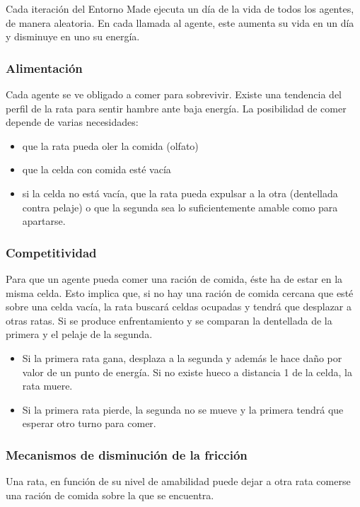 Cada iteración del Entorno Made ejecuta un día de la vida de todos los agentes,
de manera aleatoria. En cada llamada al agente, este aumenta su vida en un día y
disminuye en uno su energía.

\subsubsection{Alimentación}

Cada agente se ve obligado a comer para sobrevivir. Existe una tendencia del
perfil de la rata para sentir hambre ante baja energía. La posibilidad de comer
depende de varias necesidades:
\begin{itemize}
 \item que la rata pueda oler la comida (olfato)
 \item que la celda con comida esté vacía
 \item si la celda no está vacía, que la rata pueda expulsar a la otra
(dentellada contra pelaje) o que la segunda sea lo suficientemente amable como
para apartarse.
\end{itemize}


\subsubsection{Competitividad}

Para que un agente pueda comer una ración de comida, éste ha de estar en la
misma celda. Esto implica que, si no hay una ración de comida cercana que esté
sobre una celda vacía, la rata buscará celdas ocupadas y tendrá que desplazar a
otras ratas. Si se produce enfrentamiento y se comparan la dentellada de la
primera y el pelaje de la segunda.

\begin{itemize}
 \item Si la primera rata gana, desplaza a la
segunda y además le hace daño por valor de un punto de energía. Si no existe
hueco a distancia 1 de la celda, la rata muere.
 \item Si la primera
rata pierde, la segunda no se mueve y la primera tendrá que esperar otro turno
para comer.
\end{itemize}


\subsubsection{Mecanismos de disminución de la fricción}

Una rata, en función de su nivel de amabilidad puede dejar a otra rata comerse
una ración de comida sobre la que se encuentra. 

